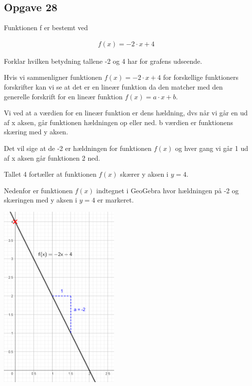 \subsection{Opgave 28}

Funktionen f er bestemt ved

\begin{align*}
    f(x) = -2\cdot x + 4
\end{align*}

Forklar hvilken betydning tallene -2 og 4 har for grafens udseende.

\ans

Hvis vi sammenligner funktionen $f(x) = -2\cdot x + 4$
for forskellige funktioners forskrifter kan vi se at det er en lineær funktion 
da den matcher med den generelle forskrift for en lineær funktion
$f(x) = a\cdot x + b$.

Vi ved at a værdien for en lineær funktion er dens hældning, dvs når vi går en ud af x aksen, går funktionen hældningen
op eller ned. b værdien er funktionens skæring med y aksen.

Det vil sige at de -2 er hældningen for funktionen $f(x)$ og hver gang vi går 1 ud af x aksen
går funktionen 2 ned.

Tallet 4 fortæller at funktionen $f(x)$ skærer y aksen i $y = 4$.

Nedenfor er funktionen $f(x)$ indtegnet i GeoGebra hvor hældningen på -2 og skæringen med y aksen i 
$y = 4$ er markeret.

\includegraphics[width=6cm]{Opgave_21-30/Opgave_28/28.png}